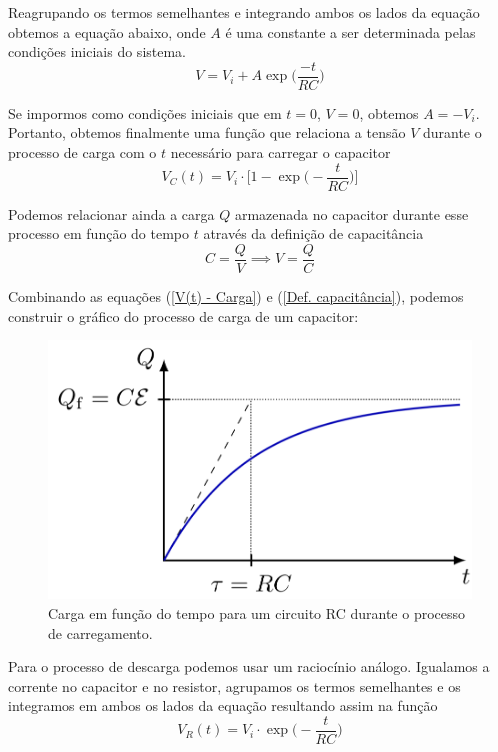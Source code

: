 \documentclass[letterpaper, 12pt]{article}
\begin{document}
Reagrupando os termos semelhantes e integrando ambos os lados da equação obtemos a equação abaixo, onde $A$ é uma constante a ser determinada pelas condições iniciais do sistema.
\begin{equation}\label{V=V_i+Ae^(-t/RC)}
    V=V_{i}+A\exp\Bigg(\frac{-t}{RC}\Bigg)
\end{equation}

Se impormos como condições iniciais que em $t=0$, $V=0$, obtemos $A=-V_{i}$. Portanto, obtemos finalmente uma função que relaciona a tensão $V$ durante o processo de carga com o $t$ necessário para carregar o capacitor
\begin{equation}\label{V(t) - Carga}
    V_{C}(t)=V_{i}\cdot\Bigg[1-\exp\Bigg(-\frac{t}{RC}\Bigg)\Bigg]
\end{equation}

Podemos relacionar ainda a carga $Q$ armazenada no capacitor durante esse processo em função do tempo $t$ através da definição de capacitância
\begin{equation}\label{Def. capacitância}
    C=\frac{Q}{V}\implies V=\frac{Q}{C}
\end{equation}

Combinando as equações (\ref{V(t) - Carga}) e (\ref{Def. capacitância}), podemos construir o gráfico do processo de carga de um capacitor:
\begin{figure}[h]
    \centering
    \includegraphics[width=0.5\linewidth]{figures/RC-003.png}
    \caption{Carga em função do tempo para um circuito RC durante o processo de carregamento.}
    \label{RC-003}
\end{figure}

Para o processo de descarga podemos usar um raciocínio análogo. Igualamos a corrente no capacitor e no resistor, agrupamos os termos semelhantes e os integramos em ambos os lados da equação resultando assim na função
\begin{equation}\label{V(t) - Descarga}
    V_{R}(t)=V_{i}\cdot\exp\Bigg(-\frac{t}{RC}\Bigg)
\end{equation}
\end{document}
